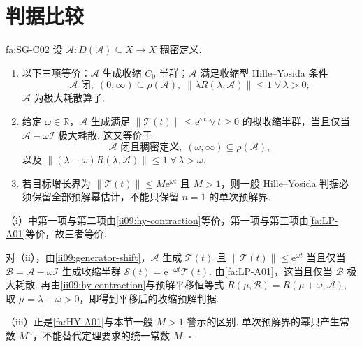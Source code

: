 \section{判据比较}\label{sec:ii09-criteria-comparison}

\begin{FAProposition}[C][生成准则比较]{fa:SG-C02}
设 \(\displaystyle \mathcal A:D(\mathcal A)\subseteq X\to X\)
稠密定义.
\begin{enumerate}[label=\textnormal{(\roman*)}]
\item 以下三项等价：\(\displaystyle\mathcal A\) 生成收缩 \(\displaystyle C_0\) 半群；\(\displaystyle\mathcal A\) 满足收缩型 Hille--Yosida 条件
\[
\mathcal A\text{ 闭},
\;
(0,\infty)\subseteq\rho(\mathcal A),
\;
\|\lambda R(\lambda,\mathcal A)\|\leqslant1
\;
\forall\,\lambda>0;
\]
\(\displaystyle\mathcal A\) 为极大耗散算子.
\item 给定 \(\displaystyle\omega\in\mathbb R\)，\(\displaystyle\mathcal A\) 生成满足 \(\displaystyle \|\mathcal T(t)\| \leqslant \mathrm{e}^{\omega t} \; \forall\,t\geqslant0\)
的拟收缩半群，当且仅当 \(\displaystyle\mathcal A-\omega\mathcal I\) 极大耗散. 这又等价于
\[
\mathcal A\text{ 闭且稠密定义},
\;
(\omega,\infty)\subseteq\rho(\mathcal A),
\]
以及 \(\displaystyle \|(\lambda-\omega)R(\lambda,\mathcal A)\| \leqslant1 \; \forall\,\lambda>\omega.\)
\item 若目标增长界为 \(\displaystyle \|\mathcal T(t)\| \leqslant M\mathrm{e}^{\omega t}\)
且 \(\displaystyle M>1\)，则一般 Hille--Yosida 判据必须保留全部预解幂估计，不能只保留 \(\displaystyle n=1\) 的单次预解界.
\end{enumerate}
\end{FAProposition}

\begin{FAProof}
（i）中第一项与第二项由\autoref{ii09:hy-contraction}等价，第一项与第三项由\autoref{fa:LP-A01}等价，故三者等价.

对（ii），由\autoref{ii09:generator-shift}，\(\displaystyle\mathcal A\) 生成 \(\displaystyle\mathcal T(t)\) 且 \(\displaystyle\|\mathcal T(t)\|\leqslant\mathrm{e}^{\omega t}\) 当且仅当 \(\displaystyle\mathcal B=\mathcal A-\omega\mathcal I\) 生成收缩半群 \(\displaystyle\mathcal S(t)=\mathrm{e}^{-\omega t}\mathcal T(t)\). 由\autoref{fa:LP-A01}，这当且仅当 \(\displaystyle\mathcal B\) 极大耗散. 再由\autoref{ii09:hy-contraction}与预解平移恒等式 \(\displaystyle R(\mu,\mathcal B) = R(\mu+\omega,\mathcal A),\)
取 \(\displaystyle\mu=\lambda-\omega>0\)，即得到平移后的收缩预解判据.

（iii）正是\autoref{fa:HY-A01}与本节一般 \(\displaystyle M>1\) 警示的区别. 单次预解界的幂只产生常数 \(\displaystyle M^n\)，不能替代定理要求的统一常数 \(\displaystyle M\).
\hfill\(\square\)
\end{FAProof}


